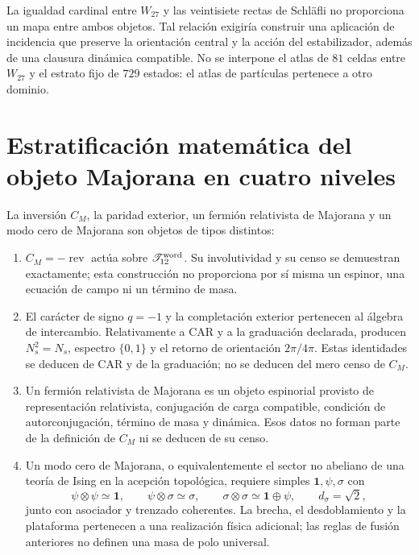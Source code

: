 La igualdad cardinal entre \(W_{27}\) y las veintisiete rectas de Schläfli
no proporciona un mapa entre ambos objetos. Tal relación exigiría construir
una aplicación de incidencia que preserve la orientación central y la acción
del estabilizador, además de una clausura dinámica compatible. No se
interpone el atlas de \(81\) celdas entre \(W_{27}\) y el estrato fijo de
\(729\) estados: el atlas de partículas pertenece a otro dominio.

\section[Niveles de Majorana]{Estratificación matemática del objeto Majorana en cuatro niveles}
\label{sec:cuatro-niveles-majorana}

La inversión \(C_M\), la paridad exterior, un fermión relativista de
Majorana y un modo cero de Majorana son objetos de tipos distintos:

\begin{enumerate}
 \item \(C_M=-\operatorname{rev}\) actúa sobre
 \(\mathscr T_{12}^{\rm word}\). Su involutividad y su censo se demuestran
 exactamente; esta construcción no proporciona por sí misma un espinor, una
 ecuación de campo ni un término de masa.

 \item El carácter de signo \(q=-1\) y la completación exterior pertenecen
 al álgebra de intercambio. Relativamente a CAR y a la graduación declarada,
 producen \(N_s^2=N_s\), espectro \(\{0,1\}\) y el retorno de orientación
 \(2\pi/4\pi\). Estas identidades se deducen de CAR y de la graduación; no se
 deducen del
 mero censo de \(C_M\).

 \item Un fermión relativista de Majorana es un objeto espinorial provisto de
 representación relativista, conjugación de carga compatible, condición de
 autorconjugación, término de masa y dinámica. Esos datos no forman parte de
 la definición de \(C_M\) ni se deducen de su censo.

 \item Un modo cero de Majorana, o equivalentemente el sector no abeliano de
 una teoría de Ising en la acepción topológica, requiere simples
 \(\mathbf 1,\psi,\sigma\) con
 \[
  \psi\otimes\psi\simeq\mathbf 1,\qquad
  \psi\otimes\sigma\simeq\sigma,\qquad
  \sigma\otimes\sigma\simeq\mathbf 1\oplus\psi,\qquad
  d_\sigma=\sqrt2,
 \]
 junto con asociador y trenzado coherentes. La brecha, el desdoblamiento y la
 plataforma pertenecen a una realización física adicional; las reglas de
 fusión anteriores no definen una masa de polo universal.
\end{enumerate}

